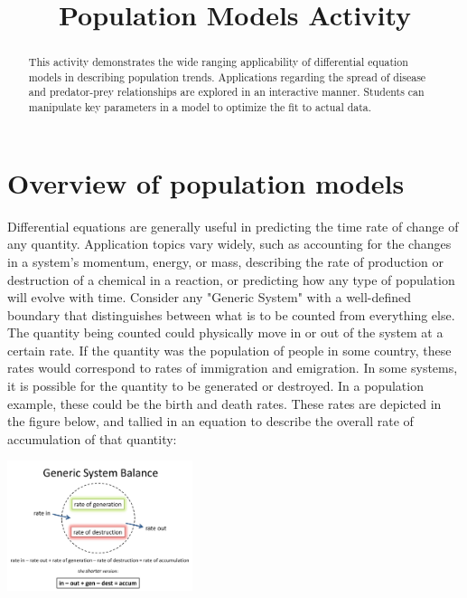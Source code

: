 \documentclass{ximera}
\title{Population Models Activity}
\begin{document}
   
\begin{abstract}
This activity demonstrates the wide ranging applicability of differential equation models in describing population trends.  Applications regarding the spread of disease and predator-prey relationships are explored in an interactive manner.  Students can manipulate key parameters in a model to optimize the fit to actual data.    
\end{abstract}
   
\maketitle
   
\section*{Overview of population models}
Differential equations are generally useful in predicting the time rate of change of any quantity.  Application topics vary widely, such as accounting for the changes in a system’s momentum, energy, or mass, describing the rate of production or destruction of a chemical in a reaction, or predicting how any type of population will evolve with time.  Consider any "Generic System" with a well-defined boundary that distinguishes between what is to be counted from everything else.  The quantity being counted could physically move in or out of the system at a certain rate.  If the quantity was the population of people in some country, these rates would correspond to rates of immigration and emigration.  In some systems, it is possible for the quantity to be generated or destroyed.  In a population example, these could be the birth and death rates.  These rates are depicted in the figure below, and tallied in an equation to describe the overall rate of accumulation of that quantity: 
 
 \begin{image}
 \includegraphics[height=1.5in]{population/populationModelPic.jpg} 
\end{image}
\end{document}
